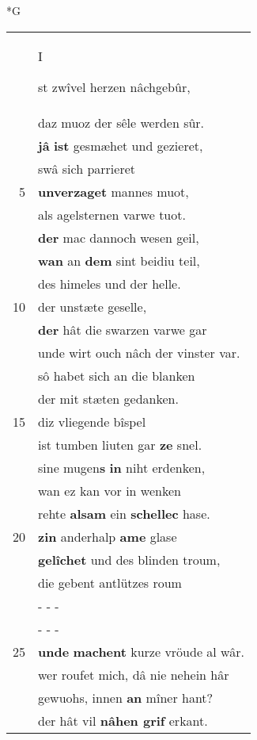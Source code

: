 \documentclass[8pt,a4paper,notitlepage]{article}
\begin{document}
\begin{table}[ht]
\begin{minipage}[t]{0.5\linewidth}
\small
\begin{center}*G
\end{center}
\begin{tabular}{rl}
 & \begin{Large}I\end{Large}st zwîvel herzen nâchgebûr,\\ 
 & daz muoz der sêle werden sûr.\\ 
 & \textbf{jâ} \textbf{ist} gesmæhet und gezieret,\\ 
 & swâ sich parrieret\\ 
5 & \textbf{unverzaget} mannes muot,\\ 
 & als agelsternen varwe tuot.\\ 
 & \textbf{der} mac dannoch wesen geil,\\ 
 & \textbf{wan} an \textbf{dem} sint beidiu teil,\\ 
 & des himeles und der helle.\\ 
10 & der unstæte geselle,\\ 
 & \textbf{der} hât die swarzen varwe gar\\ 
 & unde wirt ouch nâch der vinster var.\\ 
 & sô habet sich an die blanken\\ 
 & der mit stæten gedanken.\\ 
15 & diz vliegende bîspel\\ 
 & ist tumben liuten gar \textbf{ze} snel.\\ 
 & sine mugen\textbf{s} \textbf{in} niht erdenken,\\ 
 & wan ez kan vor in wenken\\ 
 & rehte \textbf{alsam} ein \textbf{schellec} hase.\\ 
20 & \textbf{zin} anderhalp \textbf{ame} glase\\ 
 & \textbf{gelîchet} und des blinden troum,\\ 
 & die gebent antlützes roum\\ 
 & \multicolumn{1}{l}{ - - - }\\ 
 & \multicolumn{1}{l}{ - - - }\\ 
25 & \textbf{unde} \textbf{machent} kurze vröude al wâr.\\ 
 & wer roufet mich, dâ nie nehein hâr\\ 
 & gewuohs, innen \textbf{an} mîner hant?\\ 
 & der hât vil \textbf{nâhen grif} erkant.\\ 

\end{tabular}
\end{minipage}
\end{table}
\end{document}
